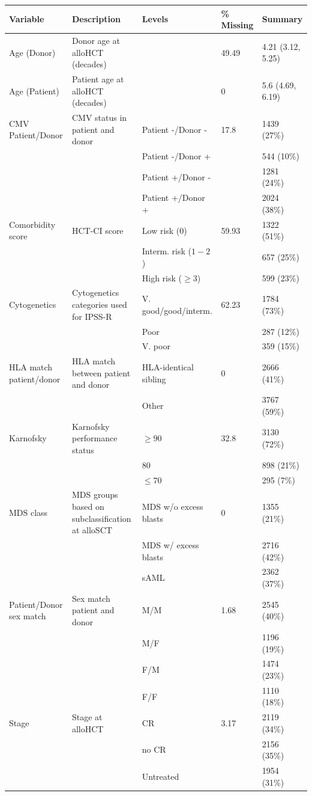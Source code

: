 \documentclass[
  letterpaper,
  DIV=11,
  numbers=noendperiod]{scrreprt}
\begin{document}
\begin{landscape}
\begin{table}
\begin{tabular}[t]{lllll}
\toprule
Variable & Description & Levels & \% Missing & Summary\\
\midrule
Age (Donor) & Donor age at alloHCT (decades) &  & 49.49 & 4.21 (3.12, 5.25)\\
Age (Patient) & Patient age at alloHCT (decades) &  & 0 & 5.6 (4.69, 6.19)\\
CMV Patient/Donor & CMV status in patient and donor & Patient -/Donor - & 17.8 & 1439 (27\%)\\
 &  & Patient -/Donor + &  & 544 (10\%)\\
 &  & Patient +/Donor - &  & 1281 (24\%)\\
 &  & Patient +/Donor + &  & 2024 (38\%)\\
Comorbidity score & HCT-CI score & Low risk (0) & 59.93 & 1322 (51\%)\\
 &  & Interm. risk ($1-2$) &  & 657 (25\%)\\
 &  & High risk ($\geq3$) &  & 599 (23\%)\\
Cytogenetics & Cytogenetics categories used for IPSS-R & V. good/good/interm. & 62.23 & 1784 (73\%)\\
 &  & Poor &  & 287 (12\%)\\
 &  & V. poor &  & 359 (15\%)\\
HLA match patient/donor & HLA match between patient and donor & HLA-identical sibling & 0 & 2666 (41\%)\\
 &  & Other &  & 3767 (59\%)\\
Karnofsky & Karnofsky performance status & $\geq90$ & 32.8 & 3130 (72\%)\\
 &  & 80 &  & 898 (21\%)\\
 &  & $\leq70$ &  & 295 (7\%)\\
MDS class & MDS groups based on subclassification at alloSCT & MDS w/o excess blasts & 0 & 1355 (21\%)\\
 &  & MDS w/ excess blasts &  & 2716 (42\%)\\
 &  & sAML &  & 2362 (37\%)\\
Patient/Donor sex match & Sex match patient and donor & M/M & 1.68 & 2545 (40\%)\\
 &  & M/F &  & 1196 (19\%)\\
 &  & F/M &  & 1474 (23\%)\\
 &  & F/F &  & 1110 (18\%)\\
Stage & Stage at alloHCT & CR & 3.17 & 2119 (34\%)\\
 &  & no CR &  & 2156 (35\%)\\
 &  & Untreated &  & 1954 (31\%)\\
\bottomrule
\end{tabular}
\endgroup{}
\end{table}
\end{landscape}
\end{document}
